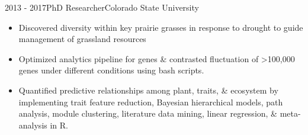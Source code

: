 \documentclass[letterpaper]{twentysecondcv} %
\begin{document}
\begin{twenty}
       \twentyitem
    	{2013 - }{2017}{PhD Researcher}{Colorado State University}
        	{}
        { \vspace{-1mm}
        {\begin{itemize}
        \item Discovered diversity within key prairie grasses in response to drought to guide management of grassland resources 
       \vspace{1mm} 
	\item Optimized analytics pipeline for genes \& contrasted fluctuation of >100,000 genes under different conditions using bash scripts.
	\vspace{1mm} 
	\item Quantified predictive relationships among plant, traits, \& ecosystem by implementing trait feature reduction, Bayesian hierarchical models, path analysis, module clustering, literature data mining, linear regression, \& meta-analysis in R.
    \end{itemize}}  \vspace{6mm}  }



                
\end{twenty}


%
\end{document}

